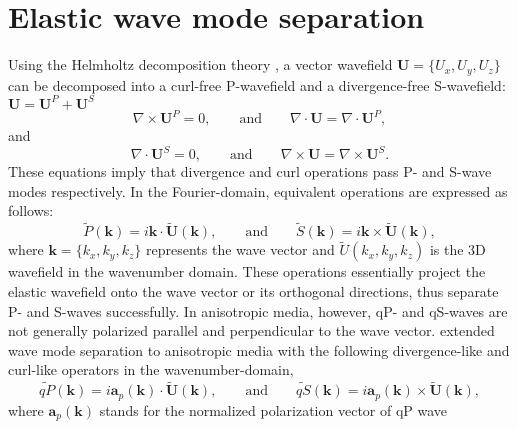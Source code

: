 \section{Elastic wave mode separation}
Using the Helmholtz decomposition theory \cite[]{morse.feshbach:1953,aki.richards:1980}, 
a vector wavefield $\mathbf{U}=\{U_{x},U_{y},U_{z}\}$ can be decomposed into
a curl-free P-wavefield and a divergence-free S-wavefield:
$\mathbf{U} = \mathbf{U}^{P} + \mathbf{U}^{S}$
\begin{equation}
\label{eq:helmP}
\nabla\times\mathbf{U}^{P} = 0,\qquad \mbox{and} \qquad \nabla\cdot\mathbf{U} = \nabla\cdot\mathbf{U}^{P},
\end{equation}
and 
\begin{equation}
\label{eq:helmS}
\nabla\cdot\mathbf{U}^{S} = 0,\qquad \mbox{and} \qquad \nabla\times\mathbf{U} = \nabla\times\mathbf{U}^{S}.
\end{equation}
These equations imply that  divergence and curl operations pass P- and S-wave modes respectively.
In the Fourier-domain, equivalent operations are expressed as follows:
\begin{equation}
\label{eq:helmPK}
\tilde{P}(\mathbf{k}) = i\mathbf{k}\cdot\tilde{\mathbf{U}}(\mathbf{k}), \qquad \mbox{and} \qquad \widetilde{S}(\mathbf{k}) = i\mathbf{k}\times\tilde{\mathbf{U}}(\mathbf{k}),
\end{equation}
where $\mathbf{k}=\{k_{x}, k_{y}, k_{z}\}$ represents the wave vector and $\tilde{U}(k_{x}, k_{y}, k_{z})$ is the
 3D wavefield in the wavenumber domain. 
These operations essentially project the elastic wavefield onto the wave vector or its orthogonal directions,
thus separate P- and S-waves successfully.
In anisotropic media, however, qP- and qS-waves are not generally polarized parallel and perpendicular to the wave vector.
\cite {dellinger.etgen:1990} extended wave mode separation to anisotropic media with the following divergence-like and
curl-like operators in the wavenumber-domain,
\begin{equation}
\label{eq:div.curl.like}
\widetilde{qP}(\mathbf{k}) = i\mathbf{a}_{p}(\mathbf{k})\cdot\tilde{\mathbf{U}}(\mathbf{k}), \qquad \mbox{and} \qquad \widetilde{qS}(\mathbf{k}) = i\mathbf{a}_{p}(\mathbf{k})\times\tilde{\mathbf{U}}(\mathbf{k}),
\end{equation}
where $\mathbf{a}_{p}(\mathbf{k})$ stands for the normalized polarization vector of qP wave 
